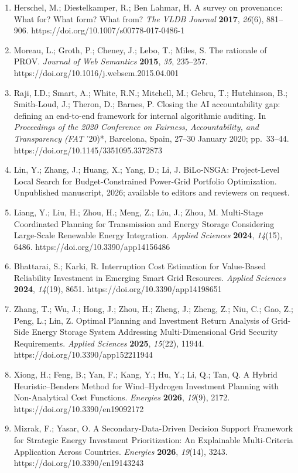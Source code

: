 \documentclass[
  10pt,
  a4paper,
]{article}
\begin{document}
\begin{enumerate}
{  Computation Conference Companion (GECCO '22 Companion)}, Boston, MA,
  USA, 9--13 July 2022; pp.~1757--1762.
  https://doi.org/10.1145/3520304.3533974
\item
  Herschel, M.; Diestelkamper, R.; Ben Lahmar, H. A survey on
  provenance: What for? What form? What from? \emph{The VLDB Journal}
  \textbf{2017}, \emph{26}(6), 881--906.
  https://doi.org/10.1007/s00778-017-0486-1
\item
  Moreau, L.; Groth, P.; Cheney, J.; Lebo, T.; Miles, S. The rationale
  of PROV. \emph{Journal of Web Semantics} \textbf{2015}, \emph{35},
  235--257. https://doi.org/10.1016/j.websem.2015.04.001
\item
  Raji, I.D.; Smart, A.; White, R.N.; Mitchell, M.; Gebru, T.;
  Hutchinson, B.; Smith-Loud, J.; Theron, D.; Barnes, P. Closing the AI
  accountability gap: defining an end-to-end framework for internal
  algorithmic auditing. In \emph{Proceedings of the 2020 Conference on
  Fairness, Accountability, and Transparency (FAT} '20)*, Barcelona,
  Spain, 27--30 January 2020; pp.~33--44.
  https://doi.org/10.1145/3351095.3372873
\item
  Lin, Y.; Zhang, J.; Huang, X.; Yang, D.; Li, J. BiLo-NSGA:
  Project-Level Local Search for Budget-Constrained Power-Grid Portfolio
  Optimization. Unpublished manuscript, 2026; available to editors and
  reviewers on request.
\item
  Liang, Y.; Liu, H.; Zhou, H.; Meng, Z.; Liu, J.; Zhou, M. Multi-Stage
  Coordinated Planning for Transmission and Energy Storage Considering
  Large-Scale Renewable Energy Integration. \emph{Applied Sciences}
  \textbf{2024}, \emph{14}(15), 6486.
  https://doi.org/10.3390/app14156486
\item
  Bhattarai, S.; Karki, R. Interruption Cost Estimation for Value-Based
  Reliability Investment in Emerging Smart Grid Resources. \emph{Applied
  Sciences} \textbf{2024}, \emph{14}(19), 8651.
  https://doi.org/10.3390/app14198651
\item
  Zhang, T.; Wu, J.; Hong, J.; Zhou, H.; Zheng, J.; Zheng, Z.; Niu, C.;
  Gao, Z.; Peng, L.; Lin, Z. Optimal Planning and Investment Return
  Analysis of Grid-Side Energy Storage System Addressing
  Multi-Dimensional Grid Security Requirements. \emph{Applied Sciences}
  \textbf{2025}, \emph{15}(22), 11944.
  https://doi.org/10.3390/app152211944
\item
  Xiong, H.; Feng, B.; Yan, F.; Kang, Y.; Hu, Y.; Li, Q.; Tan, Q. A
  Hybrid Heuristic--Benders Method for Wind--Hydrogen Investment
  Planning with Non-Analytical Cost Functions. \emph{Energies}
  \textbf{2026}, \emph{19}(9), 2172. https://doi.org/10.3390/en19092172
\item
  Mizrak, F.; Yasar, O. A Secondary-Data-Driven Decision Support
  Framework for Strategic Energy Investment Prioritization: An
  Explainable Multi-Criteria Application Across Countries.
  \emph{Energies} \textbf{2026}, \emph{19}(14), 3243.
  https://doi.org/10.3390/en19143243
\end{enumerate}
\end{document}
